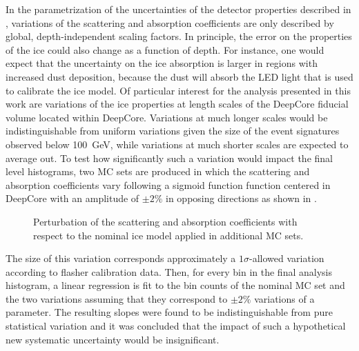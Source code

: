 In the parametrization of the uncertainties of the detector properties described in , variations of the scattering and absorption coefficients are only described by global, depth-independent scaling factors.
In principle, the error on the properties of the ice could also change as a function of depth.
For instance, one would expect that the uncertainty on the ice absorption is larger in regions with increased dust deposition, because the dust will absorb the LED light that is used to calibrate the ice model.
Of particular interest for the analysis presented in this work are variations of the ice properties at length scales of the DeepCore fiducial volume located within DeepCore.
Variations at much longer scales would be indistinguishable from uniform variations given the size of the event signatures observed below 100~GeV, while variations at much shorter scales are expected to average out.
To test how significantly such a variation would impact the final level histograms, two MC sets are produced in which the scattering and absorption coefficients vary following a sigmoid function function centered in DeepCore with an amplitude of $\pm 2\%$ in opposing directions as shown in .
\begin{figure}
    \centering
    \caption{Perturbation of the scattering and absorption coefficients with respect to the nominal ice model applied in additional MC sets.}
    \label{fig:step-function-ice-model}
\end{figure}
The size of this variation corresponds approximately a $1\sigma$-allowed variation according to flasher calibration data. Then, for every bin in the final analysis histogram, a linear regression is fit to the bin counts of the nominal MC set and the two variations assuming that they correspond to $\pm 2\%$ variations of a parameter.
The resulting slopes were found to be indistinguishable from pure statistical variation and it was concluded that the impact of such a hypothetical new systematic uncertainty would be insignificant.


